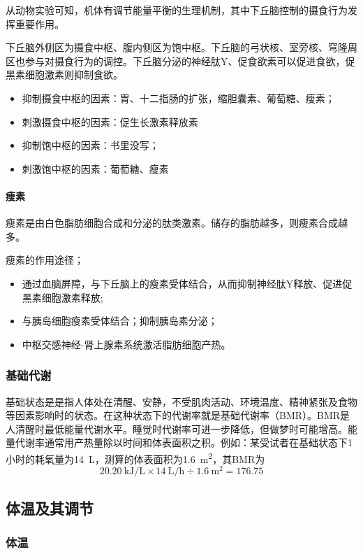 从动物实验可知，机体有调节能量平衡的生理机制，其中下丘脑控制的摄食行为发挥重要作用。

下丘脑外侧区为摄食中枢、腹内侧区为饱中枢。下丘脑的弓状核、室旁核、穹隆周区也参与对摄食行为的调控。下丘脑分泌的神经肽Y、促食欲素可以促进食欲，促黑素细胞激素则抑制食欲。

\begin{itemize}
	\item 抑制摄食中枢的因素：胃、十二指肠的扩张，缩胆囊素、葡萄糖、瘦素；
	\item 刺激摄食中枢的因素：促生长激素释放素
	\item 抑制饱中枢的因素：书里没写；
	\item 刺激饱中枢的因素：葡萄糖、瘦素
\end{itemize}

\paragraph{瘦素}

瘦素是由白色脂肪细胞合成和分泌的肽类激素。储存的脂肪越多，则瘦素合成越多。

瘦素的作用途径；
\begin{itemize}
	\item 通过血脑屏障，与下丘脑上的瘦素受体结合，从而抑制神经肽Y释放、促进促黑素细胞激素释放;
	\item 与胰岛细胞瘦素受体结合；抑制胰岛素分泌；
	\item 中枢交感神经-肾上腺素系统激活脂肪细胞产热。
\end{itemize}

\subsubsection{基础代谢}

基础状态是是指人体处在清醒、安静，不受肌肉活动、环境温度、精神紧张及食物等因素影响时的状态。在这种状态下的代谢率就是基础代谢率（BMR）。BMR是人清醒时最低能量代谢水平。睡觉时代谢率可进一步降低，但做梦时可能增高。能量代谢率通常用产热量除以时间和体表面积之积。例如：某受试者在基础状态下1小时的耗氧量为\SI{14}{\L}，测算的体表面积为\SI{1.6}{\square\m}，其BMR为\[\SI{20.20}{\kJ\per\L}\times\SI{14}{\L\per\hour}\div\SI{1.6}{\square\m}=176.75\]

\subsection{体温及其调节}

\subsubsection{体温}

